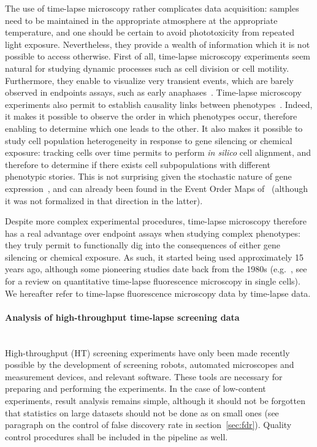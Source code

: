 The use of time-lapse microscopy rather complicates data acquisition: samples need to be maintained in the appropriate atmosphere at the appropriate temperature, and one should be certain to avoid phototoxicity from repeated light exposure. Nevertheless, they provide a wealth of information which it is not possible to access otherwise. First of all, time-lapse microscopy experiments seem natural for studying dynamic processes such as cell division or cell motility. Furthermore, they enable to visualize very transient events, which are barely observed in endpoints assays, such as early anaphases~\cite{pmid20360735}. Time-lapse microscopy experiments also permit to establish causality links between phenotypes~\cite{pmid15539606}. Indeed, it makes it possible to observe the order in which phenotypes occur, therefore enabling to determine which one leads to the other. It also makes it possible to study cell population heterogeneity in response to gene silencing or chemical exposure: tracking cells over time permits to perform \textit{in silico} cell alignment, and therefore to determine if there exists cell subpopulations with different phenotypic stories. This is not surprising given the stochastic nature of gene expression~\cite{pmid18957198}, and can already been found in the Event Order Maps of~\cite{pmid20360735} (although it was not formalized in that direction in the latter). 

Despite more complex experimental procedures, time-lapse microscopy therefore has a real advantage over endpoint assays when studying complex phenotypes: they truly permit to functionally dig into the consequences of either gene silencing or chemical exposure. As such, it started being used approximately 15 years ago, although some pioneering studies date back from the 1980s (e.g.~\cite{pmid6684600}, see~\cite{pmid19575655} for a review on quantitative time-lapse fluorescence microscopy in single cells). We hereafter refer to time-lapse fluorescence microscopy data by time-lapse data.

\paragraph{Analysis of high-throughput time-lapse screening data}
~\\ High-throughput (HT) screening experiments have only been made recently possible by the development of screening robots, automated microscopes and measurement devices, and relevant software. These tools are necessary for preparing and performing the experiments. In the case of low-content experiments, result analysis remains simple, although it should not be forgotten that statistics on large datasets should not be done as on small ones (see paragraph on the control of false discovery rate in section~\ref{sec:fdr}). Quality control procedures shall be included in the pipeline as well.

